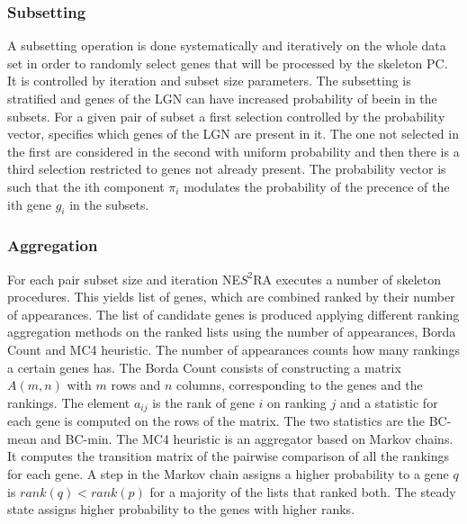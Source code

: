 		

		\subsubsection{Subsetting}
		A subsetting operation is done systematically and iteratively on the whole data set in order to randomly select genes that will be processed by the skeleton PC.
		It is controlled by iteration and subset size parameters.
		The subsetting is stratified and genes of the LGN can have increased probability of beein in the subsets.
		For a given pair of subset a first selection controlled by the probability vector, specifies which genes of the LGN are present in it.
		The one not selected in the first are considered in the second with uniform probability and then there is a third selection restricted to genes not already present.
		The probability vector is such that the ith component $\pi_i$ modulates the probability of the precence of the ith gene $g_i$ in the subsets.

		\subsubsection{Aggregation}
		For each pair subset size and iteration NE$S^2$RA executes a number of skeleton procedures.
		This yields list of genes, which are combined ranked by their number of appearances.
		The list of candidate genes is produced applying different ranking aggregation methods on the ranked lists using the number of appearances, Borda Count and MC4 heuristic.
		The number of appearances counts how many rankings a certain genes has.
		The Borda Count consists of constructing a matrix $A(m,n)$ with $m$ rows and $n$ columns, corresponding to the genes and the rankings.
		The element $a_{ij}$ is the rank of gene $i$ on ranking $j$ and a statistic for each gene is computed on the rows of the matrix.
		The two statistics are the BC-mean and BC-min.
		The MC4 heuristic is an aggregator based on Markov chains.
		It computes the transition matrix of the pairwise comparison of all the rankings for each gene.
		A step in the Markov chain assigns a higher probability to a gene $q$ is $rank(q)< rank(p)$ for a majority of the lists that ranked both.
		The steady state assigns higher probability to the genes with higher ranks.
